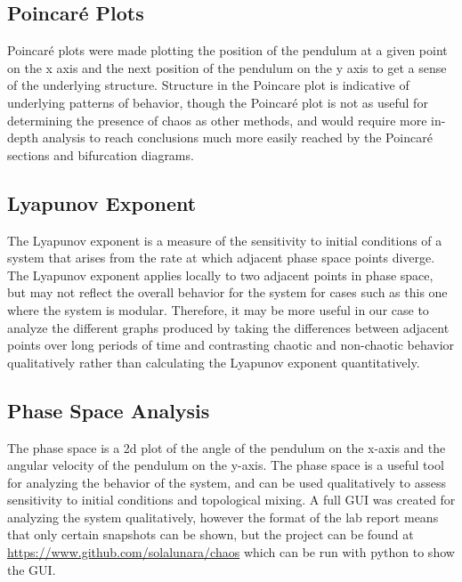 \documentclass[11pt]{article} %
\begin{document}
    \subsection{Poincar\'e Plots}
        Poincar\'e plots were made plotting the position of the pendulum at a given point on the x axis and the next position of
        the pendulum on the y axis to get a sense of the underlying structure. Structure in the Poincare plot is indicative
        of underlying patterns of behavior, though the Poincar\'e plot is not as useful for determining the presence of chaos
        as other methods, and would require more in-depth analysis to reach conclusions much more easily reached by the Poincar\'e
        sections and bifurcation diagrams.\\
    \subsection{Lyapunov Exponent}
        The Lyapunov exponent is a measure of the sensitivity to initial conditions of a system that arises from the rate at which
        adjacent phase space points diverge. The Lyapunov exponent applies locally to two adjacent points in phase space, but may
        not reflect the overall behavior for the system for cases such as this one where the system is modular. Therefore, it may be
        more useful in our case to analyze the different graphs produced by taking the differences between adjacent points over long
        periods of time and contrasting chaotic and non-chaotic behavior qualitatively rather than calculating the Lyapunov exponent
        quantitatively.\\
    \subsection{Phase Space Analysis}
        The phase space is a 2d plot of the angle of the pendulum on the x-axis and the angular velocity of the pendulum on the y-axis. 
        The phase space is a useful tool for analyzing the behavior of the system, and can be used qualitatively to assess sensitivity 
        to initial conditions and topological mixing. A full GUI was created for analyzing the system qualitatively, however the format
        of the lab report means that only certain snapshots can be shown, but the project can be found at 
        \href{https://www.github.com/solalunara/chaos}{https://www.github.com/solalunara/chaos} which can be run with python to show the GUI.\\
\end{document}
